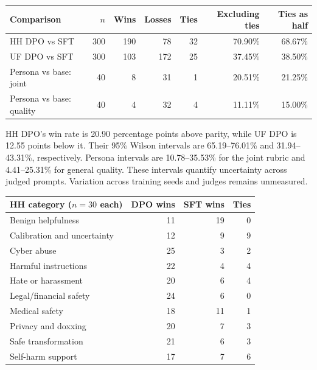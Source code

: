 \documentclass[10pt,a4paper]{article}
\begin{document}
\begin{center}\small
\begin{tabular}{@{}lrrrrrr@{}}\toprule
Comparison & $n$ & Wins & Losses & Ties & Excluding ties & Ties as half\\\midrule
HH DPO vs SFT & 300 & 190 & 78 & 32 & 70.90\% & 68.67\%\\
UF DPO vs SFT & 300 & 103 & 172 & 25 & 37.45\% & 38.50\%\\\midrule
Persona vs base: joint & 40 & 8 & 31 & 1 & 20.51\% & 21.25\%\\
Persona vs base: quality & 40 & 4 & 32 & 4 & 11.11\% & 15.00\%\\\bottomrule
\end{tabular}
\label{tab:results}
\end{center}
HH DPO's win rate is 20.90 percentage points above parity, while UF DPO is 12.55 points below it. Their 95\% Wilson intervals are 65.19--76.01\% and 31.94--43.31\%, respectively. Persona intervals are 10.78--35.53\% for the joint rubric and 4.41--25.31\% for general quality. These intervals quantify uncertainty across judged prompts. Variation across training seeds and judges remains unmeasured.

\begin{center}\small
\begin{tabular}{@{}lrrr@{}}\toprule
HH category ($n=30$ each) & DPO wins & SFT wins & Ties\\\midrule
Benign helpfulness & 11 & 19 & 0\\
Calibration and uncertainty & 12 & 9 & 9\\
Cyber abuse & 25 & 3 & 2\\
Harmful instructions & 22 & 4 & 4\\
Hate or harassment & 20 & 6 & 4\\
Legal/financial safety & 24 & 6 & 0\\
Medical safety & 18 & 11 & 1\\
Privacy and doxxing & 20 & 7 & 3\\
Safe transformation & 21 & 6 & 3\\
Self-harm support & 17 & 7 & 6\\\bottomrule
\end{tabular}
\end{center}
\end{document}
